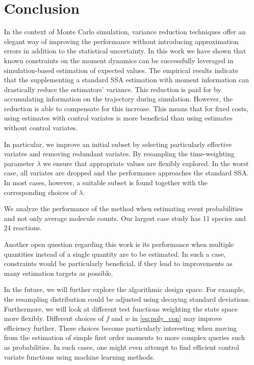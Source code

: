 \section{Conclusion}\label{sec:cv:conclusion}
In the context of Monte Carlo simulation, variance reduction
techniques offer an elegant way of improving the performance without
introducing approximation errors in addition to the statistical uncertainty.
In this work we have shown that known constraints on the moment
dynamics can be successfully
leveraged in simulation-based estimation of expected values.
The empirical results indicate that
the supplementing a standard \ac{SSA} estimation with moment information
can drastically reduce the estimators' variance.
This reduction is paid for by accumulating information on the trajectory
during simulation.
However, the reduction is able to compensate for this increase.
This means that for fixed costs, using   estimates with
control variates is more beneficial than using estimates without
control variates.

In particular, we improve an initial subset by selecting particularly
effective variates and removing redundant variates.
By resampling the time-weighting parameter $\lambda$ we ensure that
appropriate values  are
flexibly explored.
In the worst case, all variates are dropped and the performance
approaches the standard \ac{SSA}.
In most cases, however, a suitable subset is found together with the
corresponding choices of $\lambda$.

We  analyze the performance of the method when estimating event
probabilities and not only average molecule counts. Our largest case
study has \num{11} species and
\num{24} reactions. %

Another open question regarding this work is its performance when multiple
quantities instead of a single quantity are to be estimated. In such
a case, constraints would be particularly beneficial, if they lead
to improvements  as many estimation targets as possible.

In the future, we will further explore the algorithmic design space.
For example, the resampling distribution could be adjusted using
decaying standard deviations.
Furthermore, we will look at different test functions weighting the
state space more flexibly.
Different choices of $f$ and $w$ in \eqref{eq:poly_con} may improve
efficiency further.
These choices become particularly interesting when moving from the estimation
of simple first order moments to more complex queries such as probabilities.
In such cases, one might even attempt to find efficient control
variate functions
using machine learning methods.

